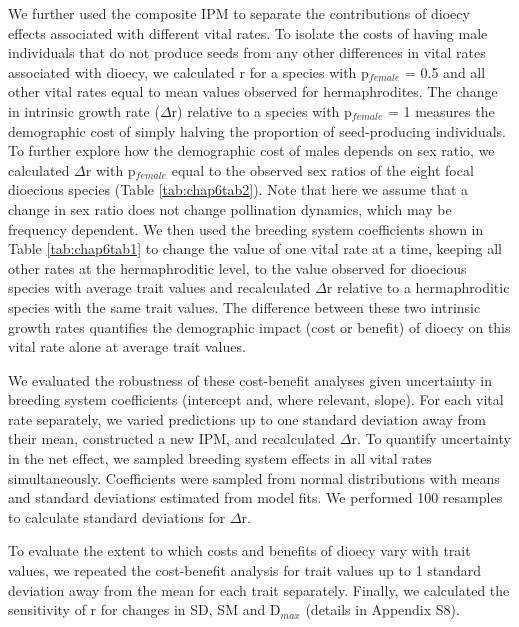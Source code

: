 \documentclass[b5paper,justified]{tufte-book} %
\begin{document}
\begin{fullwidth}
We further used the composite IPM to separate the contributions of dioecy effects associated with different vital rates.  To isolate the costs of having male individuals that do not produce seeds from any other differences in vital rates associated with dioecy, we calculated r for a species with p$_{female}$ = 0.5 and all other vital rates equal to mean values observed for hermaphrodites. The change in intrinsic growth rate ($\Delta$r) relative to a species with p$_{female}$ = 1 measures the demographic cost of simply halving the proportion of seed-producing individuals.  To further explore how the demographic cost of males depends on sex ratio, we calculated $\Delta$r with p$_{female}$ equal to the observed sex ratios of the eight focal dioecious species (Table \ref{tab:chap6tab2}). Note that here we assume that a change in sex ratio does not change pollination dynamics, which may be frequency dependent.
We then used the breeding system coefficients shown in Table \ref{tab:chap6tab1} to change the value of one vital rate at a time, keeping all other rates at the hermaphroditic level,  to the value observed for dioecious species with average trait values and recalculated $\Delta$r relative to a hermaphroditic species with the same trait values. The difference between these two intrinsic growth rates quantifies the demographic impact (cost or benefit) of dioecy on this vital rate alone at average trait values. 

We evaluated the robustness of these cost-benefit analyses given uncertainty in breeding system coefficients (intercept and, where relevant, slope). For each vital rate separately, we varied predictions up to one standard deviation away from their mean, constructed a new IPM, and recalculated $\Delta$r. To quantify uncertainty in the net effect, we sampled breeding system effects in all vital rates simultaneously. Coefficients were sampled from normal distributions with means and standard deviations estimated from model fits. We performed 100 resamples to calculate standard deviations for $\Delta$r.

To evaluate the extent to which costs and benefits of dioecy vary with trait values, we repeated the cost-benefit analysis for trait values up to 1 standard deviation away from the mean for each trait separately.  Finally, we calculated the sensitivity of r for changes in SD, SM and D$_{max}$ (details in Appendix S8).




\end{fullwidth}
\end{document}
